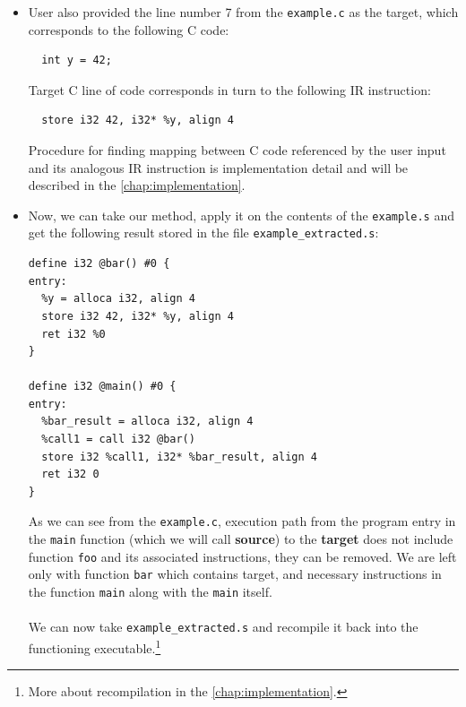 \documentclass[12pt, twoside]{fithesis2}
\renewcommand{\_}{\leavevmode \kern0.07em\vbox{\hrule width0.4em}}
\newcommand{\squarebullet}{\textcolor{black}{\raisebox{0.15em}{\rule{4pt}{4pt}}}}
\newenvironment{myItemize}{
  \begin{itemize}[
    leftmargin=2em,
    rightmargin=1em,
    itemsep=\parskip,
    parsep=0em,
    topsep=0em,
    partopsep=0em
]
  \renewcommand{\labelitemi}{\squarebullet}
  \renewcommand{\labelitemii}{\textbullet}
}{
  \end{itemize}
}
\begin{document}
\begin{myItemize}
\item User also provided the line number 7 from the \texttt{example.c}
as the target, which corresponds to the following C code:

\begin{verbatim}
  int y = 42;
\end{verbatim}

Target C line of code corresponds in turn to the following IR instruction:

\begin{verbatim}
  store i32 42, i32* %y, align 4
\end{verbatim}

Procedure for finding mapping between C code referenced by the user input and
its analogous IR instruction is implementation detail and will be described
in the \autoref{chap:implementation}.
\end{myItemize}

\begin{myItemize}
\item Now, we can take our method, apply it on the contents of the
\texttt{example.s} and get the following result stored in the file
\texttt{example_extracted.s}:

\begin{verbatim}
define i32 @bar() #0 {
entry:
  %y = alloca i32, align 4
  store i32 42, i32* %y, align 4
  ret i32 %0
}

define i32 @main() #0 {
entry:
  %bar_result = alloca i32, align 4
  %call1 = call i32 @bar()
  store i32 %call1, i32* %bar_result, align 4
  ret i32 0
}
\end{verbatim}

As we can see from the \texttt{example.c}, execution path from
the program entry in the \texttt{main} function (which we will
call \textbf{source}) to the \textbf{target} does not include function
\texttt{foo} and its associated instructions, they can be removed.
We are left only with function \texttt{bar} which contains target,
and necessary instructions in the function \texttt{main} along with
the \texttt{main} itself.
\\
\\
We can now take \texttt{example_extracted.s} and recompile it back
into the functioning executable.\footnote{
More about recompilation in the \autoref{chap:implementation}.
}
\end{myItemize}
\end{document}
